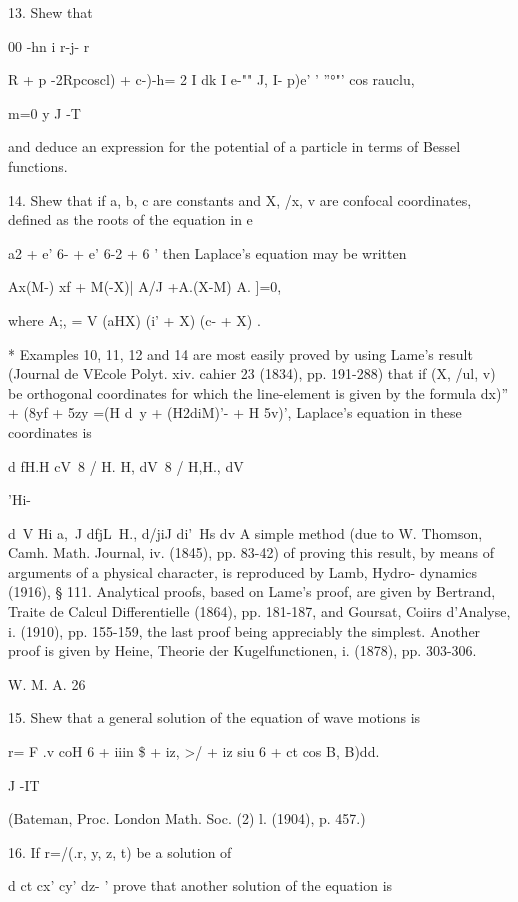 13. Shew that

00 -hn i r-j- r

 R + p -2Rpcoscl) + c-)-h= 2 I dk I e-"" J, I- p)e' ' ''°"' cos
rauclu,

m=0 y J -T

and deduce an expression for the potential of a particle in terms of
Bessel functions.

14. Shew that if a, b, c are constants and X, /x, v are confocal
coordinates, defined as the roots of the equation in e

a2 + e' 6- + e' 6-2 + 6 ' then Laplace's equation may be written

Ax(M-) xf + M(-X)| A/J +A.(X-M) A. ]=0,

where A;, = V (aHX) (i' + X) (c- + X) .


* Examples 10, 11, 12 and 14 are most easily proved by using Lame's
result (Journal de VEcole Polyt. xiv. cahier 23 (1834), pp. 191-288)
that if (X, /ul, v) be orthogonal coordinates for which the
line-element is given by the formula dx)'' + (8yf + 5zy =(H d\ y +
(H2diM)'- + H 5v)', Laplace's equation in these coordinates is

d fH.H cV\ 8 / H. H, dV\ 8 / H,H., dV\ \

'Hi-

d\ V Hi a,\ J dfjL\ H., d/jiJ di'\ Hs dv A simple method (due to W.
Thomson, Camh. Math. Journal, iv. (1845), pp. 83-42) of proving this
result, by means of arguments of a physical character, is reproduced
by Lamb, Hydro- dynamics (1916), § 111. Analytical proofs, based on
Lame's proof, are given by Bertrand, Traite de Calcul Differentielle
(1864), pp. 181-187, and Goursat, Coiirs d'Analyse, i. (1910), pp.
155-159, the last proof being appreciably the simplest. Another proof
is given by Heine, Theorie der Kugelfunctionen, i. (1878), pp.
303-306.

W. M. A. 26

%
%

15. Shew that a general solution of the equation of wave motions is

r= F .v coH 6 + iiin \$ + iz, >/ + iz siu 6 + ct cos B, B)dd.

J -IT

(Bateman, Proc. London Math. Soc. (2) l. (1904), p. 457.)

16. If r=/(.r, y, z, t) be a solution of

d ct cx' cy' dz- ' prove that another solution of the equation is

